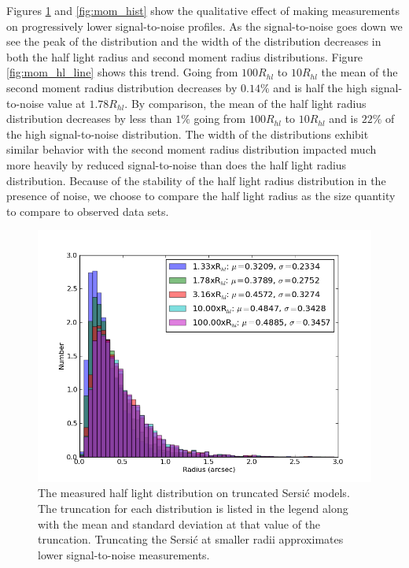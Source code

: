 \documentclass[]{article}
\begin{document}
{Figures \ref{fig:hl_hist} and \ref{fig:mom_hist} show the qualitative effect of making measurements on progressively lower signal-to-noise
profiles.  As the signal-to-noise goes down we see the peak of the distribution and the width of the distribution decreases in both the 
half light radius and second moment radius distributions.  Figure \ref{fig:mom_hl_line} shows this trend.  Going from $100R_{hl}$ to $10R_{hl}$
the mean of the second moment radius distribution decreases by $0.14\%$ and is half the high signal-to-noise value at $1.78R_{hl}$.  By comparison,
the mean of the half light radius distribution decreases by less than $1\%$ going from $100R_{hl}$ to $10R_{hl}$ and is $22\%$ of the high 
signal-to-noise distribution.  The width of the distributions exhibit similar behavior with the second moment radius distribution
impacted much more heavily by reduced signal-to-noise than does the half light radius distribution.  Because of the stability
of the half light radius distribution in the presence of noise, we choose to compare the half light radius as the size quantity
to compare to observed data sets.
\begin{figure}[H]
\centering
\includegraphics[width=5in]{validation_figures/half_light_hist.png}
\caption{The measured half light distribution on truncated Sersi{\'c} models.  The truncation for each distribution is listed in the legend along with the
mean and standard deviation at that value of the truncation.  Truncating the Sersi{\'c} at smaller radii approximates lower signal-to-noise measurements. \label{fig:hl_hist}}
\end{figure}
\begin{figure}[H]
\centering

\end{figure}}
\end{document}
